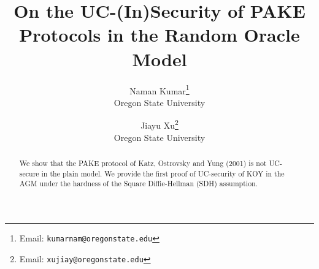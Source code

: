 \documentclass[11pt,letterpaper]{article}
\title{\LARGE{\textbf{On the UC-(In)Security of PAKE\\Protocols in the Random Oracle Model}}}
\author{{Naman Kumar}\footnote{Email: \texttt{kumarnam@oregonstate.edu}} \\Oregon State University\\ \and {Jiayu Xu}\footnote{Email: \texttt{xujiay@oregonstate.edu}}\\ Oregon State University}
\begin{document}
	\maketitle
	
	\begin{abstract}
		We show that the PAKE protocol of Katz, Ostrovsky and Yung (2001) is not UC-secure in the plain model. We provide the first proof of UC-security of KOY in the AGM under the hardness of the Square Diffie-Hellman (SDH) assumption.
	\end{abstract}

	\newpage
	\tableofcontents
	\newpage
	
	
	
	
	
	
	
	\newpage
	
	
	
	\newpage
	\appendix
	
	
	
	
\end{document}
